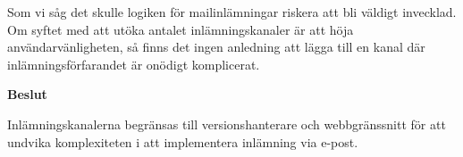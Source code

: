 Som vi såg det skulle logiken för mailinlämningar riskera att bli väldigt invecklad. Om syftet med att utöka antalet inlämningskanaler är att höja användarvänligheten, så finns det ingen anledning att lägga till en kanal där inlämningsförfarandet är onödigt komplicerat.

\begin{flushright}
  \textbf{Beslut}
  
  Inlämningskanalerna begränsas till versionshanterare och webbgränssnitt för att undvika komplexiteten i att implementera inlämning via e-post.
\end{flushright}

